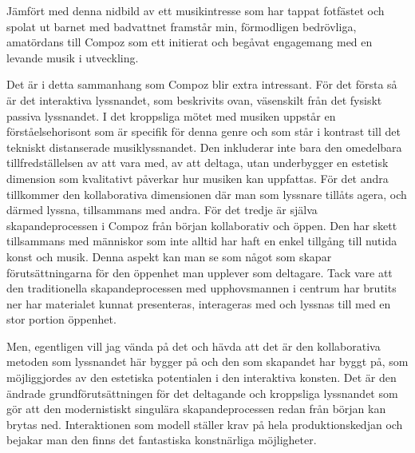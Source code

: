 \documentclass[12pt]{article}
\begin{document}
Jämfört med denna nidbild av ett musikintresse som har tappat fotfästet och spolat ut barnet med badvattnet framstår min, förmodligen bedrövliga, amatördans till Compoz som ett initierat och begåvat engagemang med en levande musik i utveckling.

Det är i detta sammanhang som Compoz blir extra intressant. För det första så är det interaktiva lyssnandet, som beskrivits ovan, väsenskilt från det fysiskt passiva lyssnandet. I det kroppsliga mötet med musiken uppstår en förståelsehorisont som är specifik för denna genre och som står i kontrast till det tekniskt distanserade musiklyssnandet. Den inkluderar inte bara den omedelbara tillfredställelsen av att vara med, av att deltaga, utan underbygger en estetisk dimension som kvalitativt påverkar hur musiken kan uppfattas. För det andra tillkommer den kollaborativa dimensionen där man som lyssnare tillåts agera, och därmed lyssna, tillsammans med andra. För det tredje är själva skapandeprocessen i Compoz från början kollaborativ och öppen. Den har skett tillsammans med människor som inte alltid har haft en enkel tillgång till nutida konst och musik. Denna aspekt kan man se som något som skapar förutsättningarna för den öppenhet man upplever som deltagare. Tack vare att den traditionella skapandeprocessen med upphovsmannen i centrum har brutits ner har materialet kunnat presenteras, interageras med och lyssnas till med en stor portion öppenhet. 

Men, egentligen vill jag vända på det och hävda att det är den kollaborativa metoden som lyssnandet här bygger på och den som skapandet har byggt på, som möjliggjordes av den estetiska potentialen i den interaktiva konsten. Det är den ändrade grundförutsättningen för det deltagande och kroppsliga lyssnandet som gör att den modernistiskt singulära skapandeprocessen redan från början kan brytas ned. Interaktionen som modell ställer krav på hela produktionskedjan och bejakar man den finns det fantastiska konstnärliga möjligheter.


\end{document}
